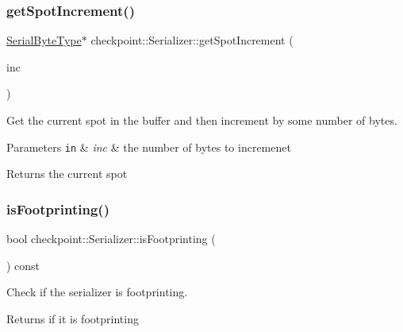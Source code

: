 \subsubsection{\texorpdfstring{get\+Spot\+Increment()}{getSpotIncrement()}}
{\footnotesize\ttfamily \hyperlink{namespacecheckpoint_ae57f01cdc0b81776c23b6c7c934c58f5}{Serial\+Byte\+Type}$\ast$ checkpoint\+::\+Serializer\+::get\+Spot\+Increment (\begin{DoxyParamCaption}\item[{\hyperlink{namespacecheckpoint_a083f6674da3f94c2901b18c6d238217c}{Serial\+Size\+Type} const}]{inc }\end{DoxyParamCaption})\hspace{0.3cm}{\ttfamily [inline]}}



Get the current spot in the buffer and then increment by some number of bytes. 


\begin{DoxyParams}[1]{Parameters}
\mbox{\tt in}  & {\em inc} & the number of bytes to incremenet\\
\hline
\end{DoxyParams}
\begin{DoxyReturn}{Returns}
the current spot 
\end{DoxyReturn}
\mbox{\label{structcheckpoint_1_1_serializer_a01f395bfaa39a8311925c71537877378}} 
\subsubsection{\texorpdfstring{is\+Footprinting()}{isFootprinting()}}
{\footnotesize\ttfamily bool checkpoint\+::\+Serializer\+::is\+Footprinting (\begin{DoxyParamCaption}{ }\end{DoxyParamCaption}) const\hspace{0.3cm}{\ttfamily [inline]}}



Check if the serializer is footprinting. 

\begin{DoxyReturn}{Returns}
if it is footprinting 
\end{DoxyReturn}
\mbox{\label{structcheckpoint_1_1_serializer_aee9d2701f508fff94bad836576443cd9}} 
